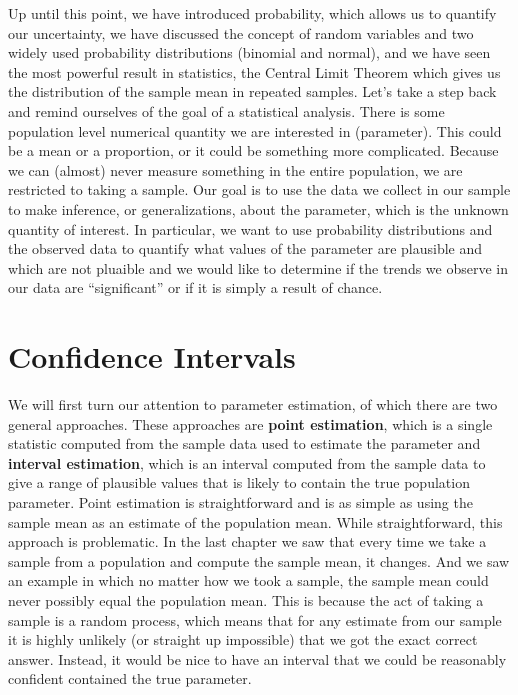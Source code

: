 \documentclass[
]{book}
\theoremstyle{definition}
\theoremstyle{definition}
\theoremstyle{definition}
\theoremstyle{remark}
\begin{document}
Up until this point, we have introduced probability, which allows us to quantify our uncertainty, we have discussed the concept of random variables and two widely used probability distributions (binomial and normal), and we have seen the most powerful result in statistics, the Central Limit Theorem which gives us the distribution of the sample mean in repeated samples. Let's take a step back and remind ourselves of the goal of a statistical analysis. There is some population level numerical quantity we are interested in (parameter). This could be a mean or a proportion, or it could be something more complicated. Because we can (almost) never measure something in the entire population, we are restricted to taking a sample. Our goal is to use the data we collect in our sample to make inference, or generalizations, about the parameter, which is the unknown quantity of interest. In particular, we want to use probability distributions and the observed data to quantify what values of the parameter are plausible and which are not pluaible and we would like to determine if the trends we observe in our data are ``significant'' or if it is simply a result of chance.

\hypertarget{ch7_s1}{%
\section{Confidence Intervals}\label{ch7_s1}}

We will first turn our attention to parameter estimation, of which there are two general approaches. These approaches are \textbf{point estimation}, which is a single statistic computed from the sample data used to estimate the parameter and \textbf{interval estimation}, which is an interval computed from the sample data to give a range of plausible values that is likely to contain the true population parameter. Point estimation is straightforward and is as simple as using the sample mean as an estimate of the population mean. While straightforward, this approach is problematic. In the last chapter we saw that every time we take a sample from a population and compute the sample mean, it changes. And we saw an example in which no matter how we took a sample, the sample mean could never possibly equal the population mean. This is because the act of taking a sample is a random process, which means that for any estimate from our sample it is highly unlikely (or straight up impossible) that we got the exact correct answer. Instead, it would be nice to have an interval that we could be reasonably confident contained the true parameter.
\end{document}
